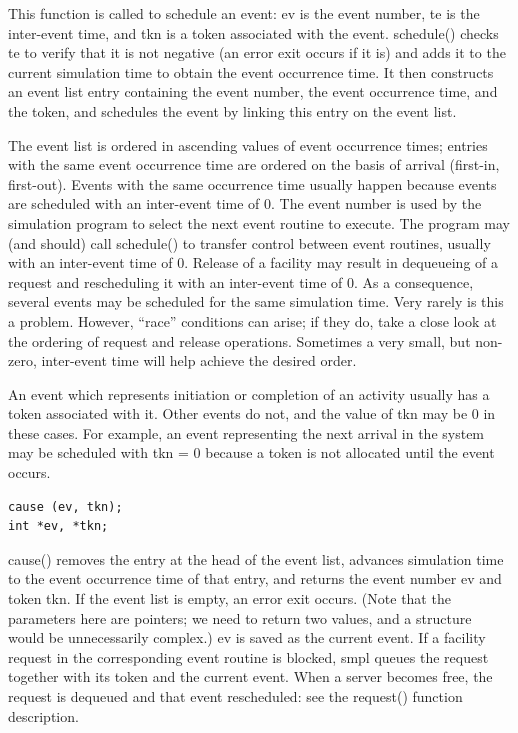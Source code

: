 This function is called to schedule an event: ev is the event number, te is
the inter-event time, and tkn is a token associated with the event.
schedule() checks te to verify that it is not negative (an error exit occurs if
it is) and adds it to the current simulation time to obtain the event
occurrence time. It then constructs an event list entry containing the event
number, the event occurrence time, and the token, and schedules the event by
linking this entry on the event list.

The event list is ordered in ascending values of event occurrence times;
entries with the same event occurrence time are ordered on the basis of
arrival (first-in, first-out). Events with the same occurrence time usually
happen because events are scheduled with an inter-event time of 0. The event
number is used by the simulation program to select the next event routine to
execute. The program may (and should) call schedule() to transfer control
between event routines, usually with an inter-event time of 0. Release of a
facility may result in dequeueing of a request and rescheduling it with an
inter-event time of 0. As a consequence, several events may be scheduled for
the same simulation time. Very rarely is this a problem. However, ``race''
conditions can arise; if they do, take a close look at the ordering of request
and release operations. Sometimes a very small, but non-zero, inter-event time
will help achieve the desired order.

An event which represents initiation or completion of an activity usually has
a token associated with it. Other events do not, and the value of tkn may be 0
in these cases. For example, an event representing the next arrival in the
system may be scheduled with tkn = 0 because a token is not allocated until
the event occurs.

\begin{verbatim}
cause (ev, tkn);
int *ev, *tkn;
\end{verbatim}

cause() removes the entry at the head of the event list, advances simulation
time to the event occurrence time of that entry, and returns the event number
ev and token tkn. If the event list is empty, an error exit occurs. (Note that
the parameters here are pointers; we need to return two values, and a structure
would be unnecessarily complex.) ev is saved as the current event. If a
facility request in the corresponding event routine is blocked, smpl queues
the request together with its token and the current event. When a server
becomes free, the request is dequeued and that event rescheduled: see the
request() function description.

